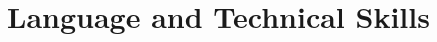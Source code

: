 \documentclass[10pt, oneside]{article}
\begin{document}
\begin{comment}
\section*{Certificate}
\begin{tabular}{p{2.1cm}|p{13cm}}	
	\toprule 
	Hong Kong Statistical Society & Higher Certificate\\
	& \footnotesize{TODO}
\end{tabular}
\end{comment}




\section*{Language and Technical Skills}
\end{document}
